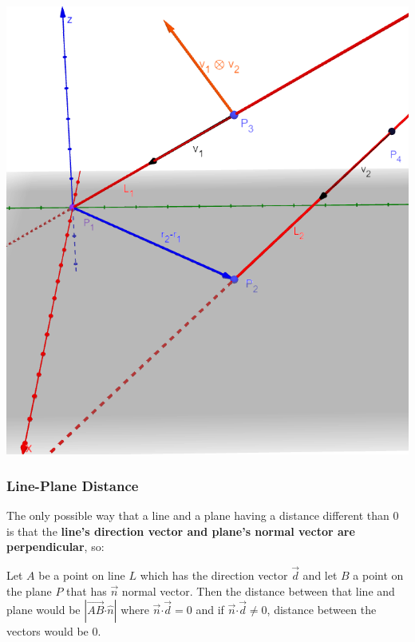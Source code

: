 \documentclass[12pt]{article}
\newcommand{\dotp}{{\boldsymbol \cdot}}
\begin{document}
\includegraphics[scale=0.65]{lnln.png}

\newpage
\subsubsection{Line-Plane Distance}
The only possible way that a line and a plane having a distance different than 0 is that the \textbf{line's direction vector and plane's normal vector are perpendicular}, so:

Let $A$ be a point on line $L$ which has the direction vector $\vec d$ and let $B$ a point on the plane $P$ that has $\vec n$ normal vector. Then the distance between that line and plane would be $\displaystyle{\left|\vec{AB} \dotp \hat n\right|}$ where $\vec n \dotp \vec d =0$ and if $\vec n \dotp \vec d \neq 0$, distance between the vectors would be 0.
\end{document}
